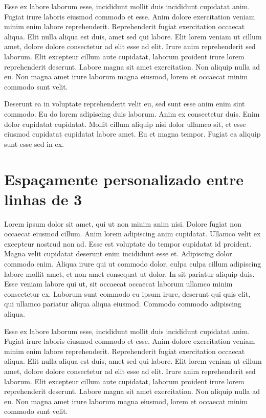 \documentclass{article}
\begin{document}
Esse ex labore laborum esse, incididunt mollit duis incididunt cupidatat anim. Fugiat irure laboris eiusmod commodo et esse. Anim dolore exercitation veniam minim enim labore reprehenderit.
Reprehenderit fugiat exercitation occaecat aliqua. Elit nulla aliqua est duis, amet sed qui labore.
Elit lorem veniam ut cillum amet, dolore dolore consectetur ad elit esse ad elit. Irure anim reprehenderit sed laborum.
Elit excepteur cillum aute cupidatat, laborum proident irure lorem reprehenderit deserunt. Labore magna sit amet exercitation.
Non aliquip nulla ad eu. Non magna amet irure laborum magna eiusmod, lorem et occaecat minim commodo sunt velit.

Deserunt ea in voluptate reprehenderit velit eu, sed sunt esse anim enim sint commodo.
Eu do lorem adipiscing duis laborum. Anim ex consectetur duis. Enim dolor cupidatat cupidatat.
Mollit cillum aliquip nisi dolor ullamco sit, et esse eiusmod cupidatat cupidatat labore amet. Eu et magna tempor.
Fugiat ea aliquip sunt esse sed in ex.

\section{Espaçamente personalizado entre linhas de 3}


Lorem ipsum dolor sit amet, qui ut non minim anim nisi. Dolore fugiat non occaecat eiusmod cillum.
Anim lorem adipiscing anim cupidatat. Ullamco velit ex excepteur nostrud non ad. Esse est voluptate do tempor cupidatat id proident.
Magna velit cupidatat deserunt enim incididunt esse et. Adipiscing dolor commodo enim.
Aliqua irure qui ut commodo dolor, culpa culpa cillum adipiscing labore mollit amet, et non amet consequat ut dolor.
In sit pariatur aliquip duis. Esse veniam labore qui ut, sit occaecat occaecat laborum ullamco minim consectetur ex.
Laborum sunt commodo eu ipsum irure, deserunt qui quis elit, qui ullamco pariatur aliqua aliqua eiusmod. Commodo commodo adipiscing aliqua.

Esse ex labore laborum esse, incididunt mollit duis incididunt cupidatat anim. Fugiat irure laboris eiusmod commodo et esse. Anim dolore exercitation veniam minim enim labore reprehenderit.
Reprehenderit fugiat exercitation occaecat aliqua. Elit nulla aliqua est duis, amet sed qui labore.
Elit lorem veniam ut cillum amet, dolore dolore consectetur ad elit esse ad elit. Irure anim reprehenderit sed laborum.
Elit excepteur cillum aute cupidatat, laborum proident irure lorem reprehenderit deserunt. Labore magna sit amet exercitation.
Non aliquip nulla ad eu. Non magna amet irure laborum magna eiusmod, lorem et occaecat minim commodo sunt velit.
\end{document}
